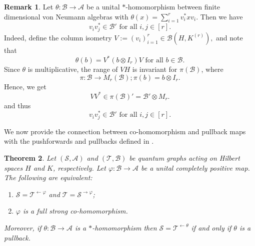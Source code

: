 \documentclass[11pt]{amsart}
\numberwithin{equation}{section}
\theoremstyle{plain}
\newtheorem{theorem}{Theorem}[section]
\theoremstyle{definition}
\newtheorem{remark}[theorem]{Remark}
\theoremstyle{remark}
\newcommand{\A}{{\mathcal{A}}}
\newcommand{\B}{{\mathcal{B}}}
\renewcommand{\S}{{\mathcal{S}}}
\newcommand{\T}{{\mathcal{T}}}
\newcommand\vphi{\varphi}
\newcommand{\foral}{\text{ for all }}
\begin{document}
\begin{remark}\label{rmk_mult}
Let  $ \theta\colon \B \to \A $ be a unital $*$-homomorphism between finite dimensional von Neumann algebras with $ \theta (x)= \sum_{i=1}^r v_i^*x v_i$.  Then we have
\[
v_iv_j^*\in \B' \foral i,j \in [r].
\]
Indeed, define the column isometry 
\( 
V:=(v_i)_{i=1}^r \in \B(H, K^{(r)}),
\)
and note that
\[
\theta(b)=V^*(b\otimes I_r)V \foral b\in \B.
\]
Since $\theta$ is multiplicative, the range of $V H$ is invariant for $\pi(\B)$, where 
\[
\pi \colon \B \to M_r(\B); \pi(b) = b \otimes I_r.
\]
Hence, we get
\[
V V^{*} \in  \pi(\B)' = \B' \otimes M_r.
\]
and thus 
\[
v_iv_j^*\in \B' \foral i,j \in [r].
\]
\end{remark}

We now provide the connection between co-homomorphism and pullback maps with the pushforwards and pullbacks defined in \cite{Wea21}. 
\begin{theorem}\label{thm:ucppullback}
Let $(\S,\A)$ and $(\T,\B)$ be quantum graphs acting on Hilbert spaces $H$ and $K$, respectively. Let $\vphi \colon \B \to \A$
be a unital completely positive map.
The following are equivalent:
\begin{enumerate}
\item $\S=\T^{\leftarrow \vphi}$ and $\T=\S^{\rightarrow \vphi}$;
\item $\vphi$ is a full strong co-homomorphism.
\end{enumerate}

Moreover, if  $\theta \colon \B \to \A$ is a $*$-homomorphism then $\S=\T^{\leftarrow \theta}$ if and only if $\theta$ is a pullback.
\end{theorem}
\end{document}
